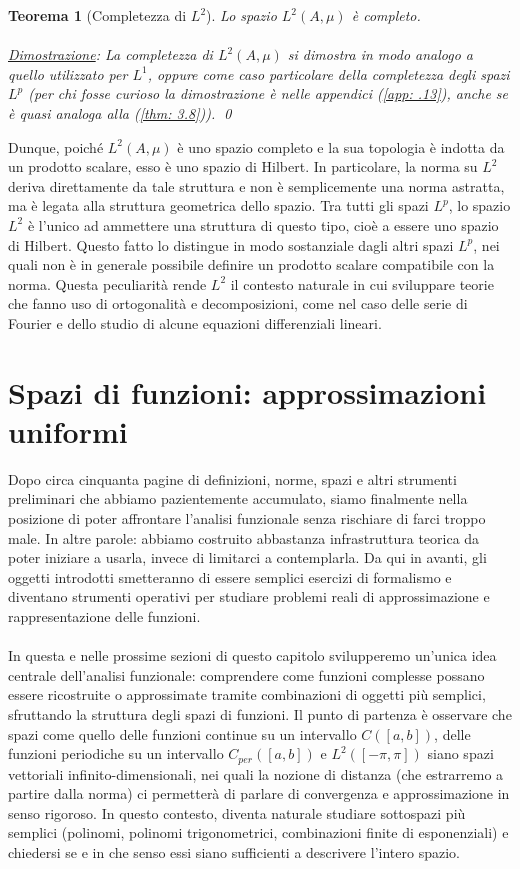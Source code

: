 \documentclass[a4paper,12pt]{report}
\newtheorem{teorema}{Teorema}[chapter]
\begin{document}
\begin{teorema}[Completezza di $L^2$]
    Lo spazio $L^2(A,\mu)$ è completo.
    \\
    \\ \underline{Dimostrazione}: La completezza di $L^2(A,\mu)$ si dimostra in modo analogo a quello utilizzato per $L^1$, oppure come caso particolare della completezza degli spazi $L^p$ (per chi fosse curioso la dimostrazione è nelle appendici (\ref{app: .13}), anche se è quasi analoga alla (\ref{thm: 3.8})). \qed
\end{teorema}

Dunque, poiché $L^2(A,\mu)$ è uno spazio completo e la sua topologia è indotta da un prodotto scalare, esso è uno spazio di Hilbert. In particolare, la norma su $L^2$ deriva direttamente da tale struttura e non è semplicemente una norma astratta, ma è legata alla struttura geometrica dello spazio.
Tra tutti gli spazi $L^p$, lo spazio $L^2$ è l’unico ad ammettere una struttura di questo tipo, cioè a essere uno spazio di Hilbert. Questo fatto lo distingue in modo sostanziale dagli altri spazi $L^p$, nei quali non è in generale possibile definire un prodotto scalare compatibile con la norma.
Questa peculiarità rende $L^2$ il contesto naturale in cui sviluppare teorie che fanno uso di ortogonalità e decomposizioni, come nel caso delle serie di Fourier e dello studio di alcune equazioni differenziali lineari.

\newpage

\section{Spazi di funzioni: approssimazioni uniformi}

Dopo circa cinquanta pagine di definizioni, norme, spazi e altri strumenti preliminari che abbiamo pazientemente accumulato, siamo finalmente nella posizione di poter affrontare l’analisi funzionale senza rischiare di farci troppo male. In altre parole: abbiamo costruito abbastanza infrastruttura teorica da poter iniziare a usarla, invece di limitarci a contemplarla. Da qui in avanti, gli oggetti introdotti smetteranno di essere semplici esercizi di formalismo e diventano strumenti operativi per studiare problemi reali di approssimazione e rappresentazione delle funzioni.
\\
\\In questa e nelle prossime sezioni di questo capitolo svilupperemo un’unica idea centrale dell’analisi funzionale: comprendere come funzioni complesse possano essere ricostruite o approssimate tramite combinazioni di oggetti più semplici, sfruttando la struttura degli spazi di funzioni.
Il punto di partenza è osservare che spazi come quello delle funzioni continue su un intervallo $C([a,b])$, delle funzioni periodiche su un intervallo $C_{per}([a,b])$ e $L^2([-\pi,\pi])$ siano spazi vettoriali infinito-dimensionali, nei quali la nozione di distanza (che estrarremo a partire dalla norma) ci permetterà di parlare di convergenza e approssimazione in senso rigoroso. In questo contesto, diventa naturale studiare sottospazi più semplici (polinomi, polinomi trigonometrici, combinazioni finite di esponenziali) e chiedersi se e in che senso essi siano sufficienti a descrivere l’intero spazio.
\end{document}

